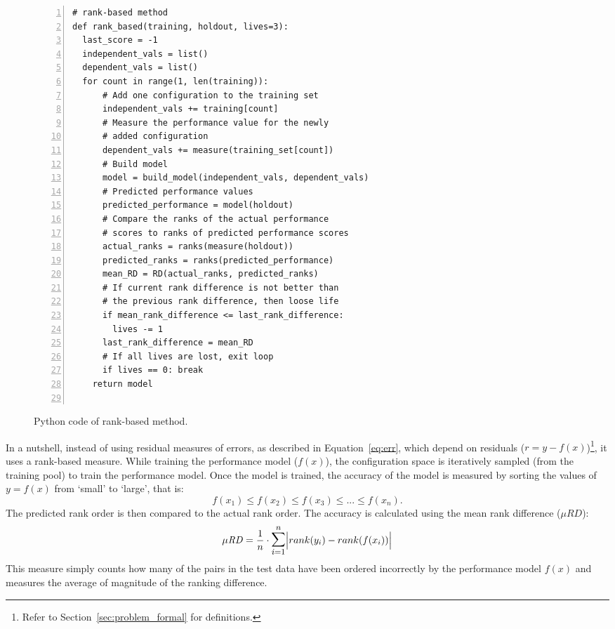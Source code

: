 \documentclass[10pt,journal,compsoc]{IEEEtran}
\DeclarePairedDelimiter\abs{\lvert}{\rvert}%
\begin{document}
\begin{figure}[t]
\small
\hspace{0.4cm}\begin{lstlisting}[xleftmargin=5.0ex,mathescape,frame=none,numbers=left]
# rank-based method
def rank_based(training, holdout, lives=3): 
  last_score = -1
  independent_vals = list()
  dependent_vals = list()
  for count in range(1, len(training)):  
      # Add one configuration to the training set
      independent_vals += training[count]      
      # Measure the performance value for the newly
      # added configuration 
      dependent_vals += measure(training_set[count])
      # Build model
      model = build_model(independent_vals, dependent_vals)     
      # Predicted performance values
      predicted_performance = model(holdout) 
      # Compare the ranks of the actual performance 
      # scores to ranks of predicted performance scores
      actual_ranks = ranks(measure(holdout))
      predicted_ranks = ranks(predicted_performance)
      mean_RD = RD(actual_ranks, predicted_ranks)
      # If current rank difference is not better than
      # the previous rank difference, then loose life
      if mean_rank_difference <= last_rank_difference:
        lives -= 1
      last_rank_difference = mean_RD
      # If all lives are lost, exit loop
      if lives == 0: break
    return model
      

\end{lstlisting}
\caption{\small{Python code of rank-based method.}
}
\label{fig:rank-based}  
\end{figure}

In a nutshell, instead of using residual measures of errors, as described in Equation~\ref{eq:err}, which depend on residuals ($r = y - f(x)$)\footnote{Refer to Section~\ref{sec:problem_formal} for definitions.}, it uses a rank-based measure. While training the performance model ($f(x)$), the configuration space is iteratively sampled (from the training pool) to train the performance model. Once the model is trained, the accuracy of the model is measured  by sorting the values of $y=f(x)$ from `small' to `large', that is:
\begin{equation}
    f(x_1) \le f(x_2) \le f(x_3) \le ... \le f(x_n).
\end{equation}
The predicted rank order is then compared to the actual rank order. The accuracy is calculated using the mean rank difference ($\mu RD$):
\begin{equation} \label{eq:rank_performance}
    \mathit{\mu RD} = \frac{1}{n} \cdot \mathlarger{\mathlarger{\sum}}_{i=1}^{n}\abs[\Big]{rank(y_i) - rank(f(x_i))}
\end{equation}
This measure simply counts how many of the pairs in the test data have been ordered incorrectly by the performance model $f(x)$ and measures the average of magnitude of the ranking difference. 
\end{document}

